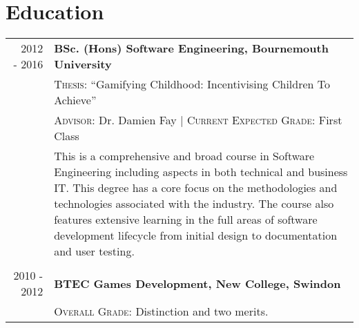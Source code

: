 \section{Education}
\begin{tabular}{r|p{11cm}}
	\ 2012 - 2016 & \textbf{BSc. (Hons) Software Engineering, Bournemouth University}\\ 
	\ & \textsc{Thesis}: ``Gamifying Childhood: Incentivising Children To Achieve'' \\
	\ & \textsc{Advisor}: Dr. Damien Fay | \normalsize \textsc{Current Expected Grade}: First Class \\
	\ & \footnotesize{This is a comprehensive and broad course in Software Engineering including aspects in both technical and business IT. This degree has a core focus on the methodologies and technologies associated with the industry. The course also features extensive learning in the full areas of software development lifecycle from initial design to documentation and user testing.} \\

	\multicolumn{2}{c}{} \\


	2010 - 2012 & \textbf{BTEC Games Development, New College, Swindon}\\
	\ & \textsc{Overall Grade}: Distinction and two merits.
\end{tabular}
